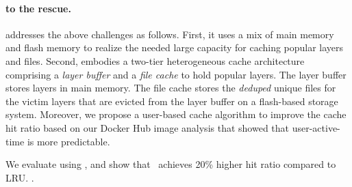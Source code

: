 \paragraph{\sysname to the rescue.}
\sysname addresses the above challenges as follows. First, it uses a mix of main memory and flash memory to realize the needed large capacity for caching popular layers and files.
Second, \sysname embodies a two-tier heterogeneous cache architecture 
comprising a {\em layer buffer} and a {\em file cache} to hold  popular layers.
The layer buffer stores layers in main memory. The file cache stores 
the \emph{deduped} unique files for the victim layers that are evicted from the layer buffer on a 
flash-based storage system.
Moreover, we propose a user-based cache algorithm to improve the cache hit ratio 
based on our Docker Hub image analysis that showed that user-active-time is more predictable.


We evaluate \sysname using , and show that
\sysname~achieves 20\% higher hit ratio compared to LRU. 
.  

